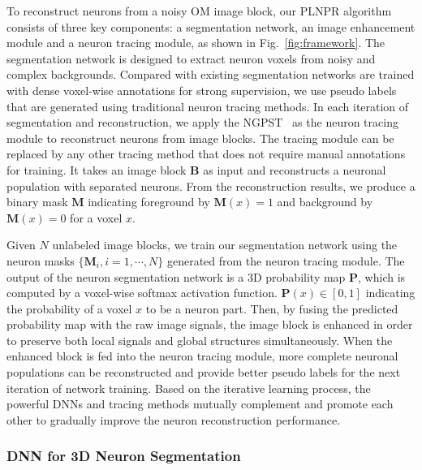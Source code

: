 To reconstruct neurons from a noisy OM image block, our PLNPR algorithm consists of three key components: a segmentation network, an image enhancement module and a neuron tracing module, as shown in Fig.~\ref{fig:framework}. 
%
The segmentation network is designed to extract neuron voxels from noisy and complex backgrounds.
Compared with existing segmentation networks are trained with dense voxel-wise annotations for strong supervision, we use pseudo labels that are generated using traditional neuron tracing methods.
%
In each iteration of segmentation and reconstruction, we apply the NGPST~\cite{Quan2015} as the neuron tracing module to reconstruct neurons from image blocks. 
The tracing module can be replaced by any other tracing method that does not require manual annotations for training.
%
It takes an image block $\mathbf{B}$ as input and reconstructs a neuronal population with separated neurons.
From the reconstruction results, we produce a binary mask $\mathbf{M}$ indicating foreground by $\mathbf{M}(x)=1$ and background by $\mathbf{M}(x)=0$ for a voxel $x$.


Given $N$ unlabeled image blocks, we train our segmentation network using the neuron masks $\{\mathbf{M}_i, i=1,\cdots,N\}$ generated from the neuron tracing module.
%
The output of the neuron segmentation network is a 3D probability map $\mathbf{P}$, which is computed by a voxel-wise softmax activation function. $\mathbf{P}(x)\in [0,1]$ indicating the probability of a voxel $x$ to be a neuron part.
%
Then, by fusing the predicted probability map with the raw image signals, the image block is enhanced in order to preserve both local signals and global structures simultaneously.
When the enhanced block is fed into the neuron tracing module, more complete neuronal populations can be reconstructed and provide better pseudo labels for the next iteration of network training. 
%
Based on the iterative learning process, the powerful DNNs and tracing methods mutually complement and promote each other to gradually improve the neuron reconstruction performance.


 

\subsubsection{DNN for 3D Neuron Segmentation}
\label{sec:network}
 
